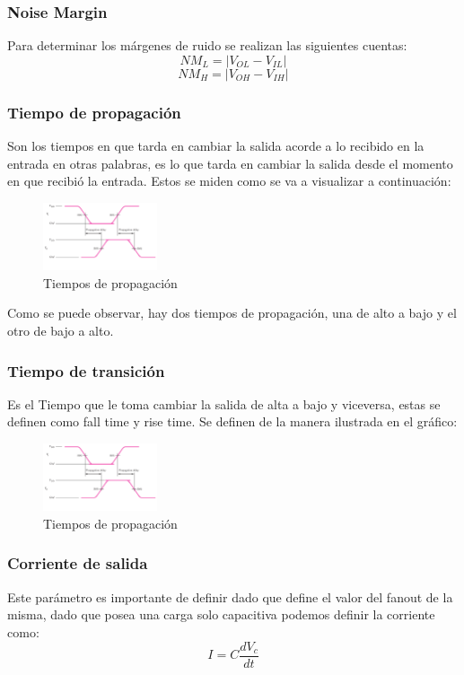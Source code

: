 \subsubsection{Noise Margin}
Para determinar los márgenes de ruido se realizan las siguientes cuentas:
$$NM_{L}=|V_{OL}-V_{IL}|$$
$$NM_{H}=|V_{OH}-V_{IH}|$$

\subsubsection{Tiempo de propagación}
Son los tiempos en que tarda en cambiar la salida acorde a lo recibido en la entrada en otras palabras, es lo que tarda en cambiar la salida desde el momento en que recibió la entrada. Estos se miden como se va a visualizar a continuación:
\begin{figure}[H]
	\centering
	\includegraphics[width=0.3\textwidth]{Ejercicio1/Propagacion.png}
	\caption{Tiempos de propagación}
\end{figure}
Como se puede observar, hay dos tiempos de propagación, una de alto a bajo y el otro de bajo a alto.

\subsubsection{Tiempo de transición}
Es el Tiempo que le toma cambiar la salida de alta a bajo y viceversa, estas se definen como fall time y rise time. Se definen de la manera ilustrada en el gráfico:
\begin{figure}[H]
	\centering
	\includegraphics[width=0.3\textwidth]{Ejercicio1/Propagacion.png}
	\caption{Tiempos de propagación}
\end{figure}

\subsubsection{Corriente de salida}
Este parámetro es importante de definir dado que define el valor del fanout de la misma, dado que posea una carga solo capacitiva podemos definir la corriente como:
$$I=C\frac{dV_c}{dt}$$ 

